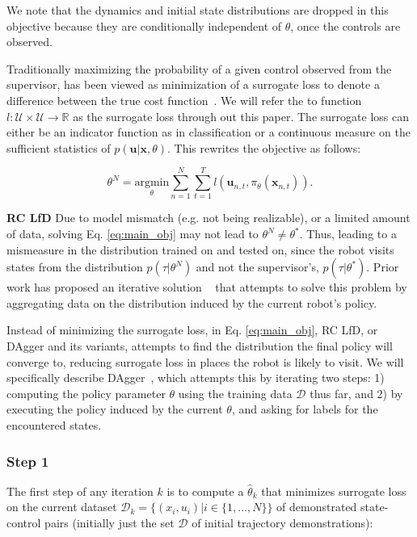 \documentclass[10pt, conference]{ieeeconf}      %
\newcommand{\bu}{\mathbf{u}}
\newcommand{\bx}{\mathbf{x}}
\newcommand{\nc}{RC LfD }
\begin{document}
We note that the dynamics and initial state distributions are dropped in this objective because they are conditionally independent of $\theta$, once the controls are observed. 

 Traditionally maximizing the probability of a given control observed from the supervisor, has been viewed as minimization of a surrogate loss to denote a difference between the true cost function~\cite{ross2010reduction,ross2010efficient}. We will refer the to function $l : \mathcal{U} \times \mathcal{U} \rightarrow \mathbb{R}$ as the surrogate loss through out this paper. The surrogate loss can either be an indicator function as in classification or a continuous measure on the sufficient statistics of $p(\bu|\bx,\theta)$.  This rewrites the objective as follows: 

\begin{equation}\label{eq:main_obj}
\theta^N = \underset{\theta}{\mbox{argmin}} \sum^N_{n=1}\sum^T_{t=1} l(\bu_{n,t}, \pi_{\theta} (\bx_{n,t})).
\end{equation}


\noindent \textbf{\nc} Due to model mismatch (e.g. not being realizable), or a limited amount of data, solving Eq. \ref{eq:main_obj} may not lead to $\theta^N \neq \theta^*$.  Thus, leading to a mismeasure in the distribution trained on and tested on, since the robot visits states from the distribution $p(\tau|\theta^N)$ and not the supervisor's, $p(\tau|\theta^*)$.  Prior work has proposed an iterative solution ~\cite{ross2010reduction} that attempts to solve this problem by aggregating data on the distribution induced by the current robot's policy.

Instead of  minimizing the surrogate loss, in Eq. \ref{eq:main_obj},  RC LfD, or DAgger and its variants, attempts to find the distribution the final policy will converge to, reducing surrogate loss in places the robot is likely to visit.
We will specifically describe DAgger~\cite{ross2010reduction}, which attempts this by iterating two steps: 1)
computing the policy parameter $\theta$ using the training data $\mathcal{D}$ thus far, and 2) by executing the policy
induced by the current $\theta$, and asking for labels for the encountered states. 
 
\subsubsection{Step 1}
The first step of any iteration $k$ is to compute a $\hat{\theta}_k$ that minimizes surrogate loss on the current dataset $\mathcal{D}_k=\{(x_i,u_i)|i\in\{1,\ldots,N\}\}$ of demonstrated state-control pairs (initially just the set $\mathcal{D}$ of initial trajectory demonstrations):
\end{document}
